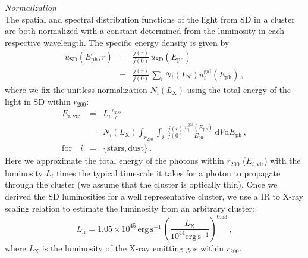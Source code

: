 \documentclass[10pt,aps,pra,reprint,amsmath,amsfonts,amssymb,showpacs]{revtex4-1}
\newcommand{\rmn}{\mathrm}
\newcommand{\ph}{\rmn{ph}}
\newcommand{\eph}{E_\ph}
\newcommand{\vir}{\rmn{vir}}
\newcommand{\gal}{\rmn{gal}}
\newcommand{\sd}{\rmn{SD}}
\newcommand{\lx}{L_\rmn{X}}
\newcommand{\dd}{\rmn{d}}
\newcommand{\rvir}{r_{200}}
\newcommand{\ir}{\rmn{ir}}
\begin{document}
{\it Normalization}\\ The spatial and spectral distribution functions
of the light from SD in a cluster are both normalized with a constant
determined from the luminosity in each respective wavelength. The
specific energy density is given by
\begin{eqnarray} 
u_\sd(\eph, r) &=& \frac{j(r)}{j(0)}\,u_\sd(\eph) \nonumber\\
&=& \frac{j(r)}{j(0)}\,\sum_i N_i(\lx) u_i^\gal(\eph)\,,
\end{eqnarray}
where we fix the unitless normalization $N_i(\lx)$ using the total
energy of the light in SD  within $\rvir$:
\begin{eqnarray} 
  E_{i,\vir} &=& L_i \frac{\rvir}{c} \nonumber \\
  &=&N_i(\lx)\int_{\rvir} \int_i \,\frac{j(r)}{j(0)} 
  \frac{u_i^\gal(\eph)}{\eph}\,\dd V\dd \eph\,,\nonumber \\
 \rmn{for}\quad i&=&\{\rmn{stars,dust}\}\,.
\label{eq:E_SD}
\end{eqnarray}
Here we approximate the total energy of the photons within $\rvir$
($E_{i,\vir}$) with the luminosity $L_i$ \cite{2008A&A...490..547G}
times the typical timescale it takes for a photon to propagate through
the cluster (we assume that the cluster is optically thin). Once we
derived the SD luminosities for a well representative cluster, we use
a IR to X-ray scaling relation to estimate the luminosity from an
arbitrary cluster:
\begin{equation}
L_\ir=1.05\times10^{45}\,\rmn{erg\,s}^{-1}\,
\left(\frac{\lx}{10^{44}\rmn{erg\,s}^{-1}}\right)^{0.53}\,,
\label{eq:SD-X}
\end{equation}
where $\lx$ is the luminosity of the X-ray emitting gas within
$\rvir$.
\end{document}
